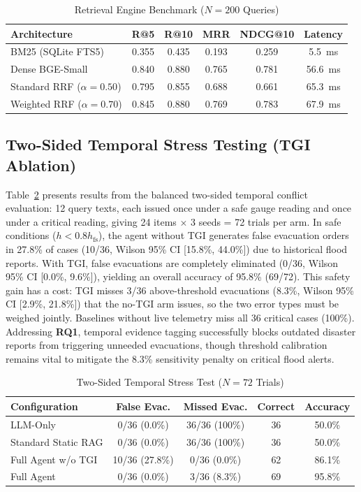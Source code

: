 \documentclass[conference]{IEEEtran}
\begin{document}
\begin{table}[ht]
\caption{Retrieval Engine Benchmark ($N=200$ Queries)}
\label{tab:retrieval}
\centering
\scriptsize
\setlength{\tabcolsep}{2pt}
\begin{tabular*}{\columnwidth}{@{\extracolsep{\fill}}lccccc@{}}
\toprule
Architecture & R@5 & R@10 & MRR & NDCG@10 & Latency \\
\midrule
BM25 (SQLite FTS5) & 0.355 & 0.435 & 0.193 & 0.259 & 5.5~ms \\
Dense BGE-Small & 0.840 & 0.880 & 0.765 & 0.781 & 56.6~ms \\
Standard RRF ($\alpha=0.50$) & 0.795 & 0.855 & 0.688 & 0.661 & 65.3~ms \\
\midrule
Weighted RRF ($\alpha=0.70$) & 0.845 & 0.880 & 0.769 & 0.783 & 67.9~ms \\
\bottomrule
\end{tabular*}
\end{table}

\subsection{Two-Sided Temporal Stress Testing (TGI Ablation)}
Table~\ref{tab:tgi} presents results from the balanced two-sided temporal conflict evaluation: 12 query texts, each issued once under a safe gauge reading and once under a critical reading, giving 24 items $\times$ 3 seeds = 72 trials per arm. In safe conditions ($h < 0.8 h_{\mathrm{fs}}$), the agent without TGI generates false evacuation orders in 27.8\% of cases (10/36, Wilson 95\% CI [15.8\%, 44.0\%]) due to historical flood reports. With TGI, false evacuations are completely eliminated (0/36, Wilson 95\% CI [0.0\%, 9.6\%]), yielding an overall accuracy of 95.8\% (69/72). This safety gain has a cost: TGI misses 3/36 above-threshold evacuations (8.3\%, Wilson 95\% CI [2.9\%, 21.8\%]) that the no-TGI arm issues, so the two error types must be weighed jointly. Baselines without live telemetry miss all 36 critical cases (100\%). Addressing \textbf{RQ1}, temporal evidence tagging successfully blocks outdated disaster reports from triggering unneeded evacuations, though threshold calibration remains vital to mitigate the 8.3\% sensitivity penalty on critical flood alerts.

\begin{table}[ht]
\caption{Two-Sided Temporal Stress Test ($N=72$ Trials)}
\label{tab:tgi}
\centering
\scriptsize
\setlength{\tabcolsep}{2pt}
\begin{tabular*}{\columnwidth}{@{\extracolsep{\fill}}lcccc@{}}
\toprule
Configuration & False Evac. & Missed Evac. & Correct & Accuracy \\
\midrule
LLM-Only & 0/36 (0.0\%) & 36/36 (100\%) & 36 & 50.0\% \\
Standard Static RAG & 0/36 (0.0\%) & 36/36 (100\%) & 36 & 50.0\% \\
Full Agent w/o TGI & 10/36 (27.8\%) & 0/36 (0.0\%) & 62 & 86.1\% \\
Full Agent & 0/36 (0.0\%) & 3/36 (8.3\%) & 69 & 95.8\% \\
\bottomrule
\end{tabular*}
\end{table}
\end{document}
